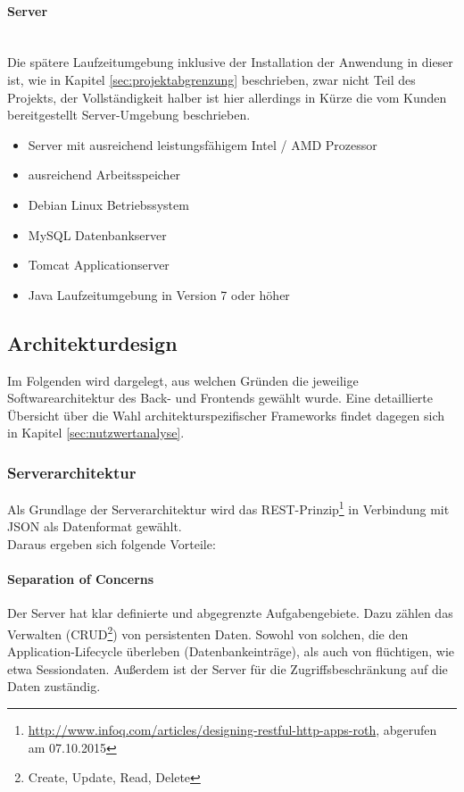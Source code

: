 \documentclass[12pt, xcolor=dvipsnames]{scrartcl}
\begin{document}
\paragraph{Server} ~\\
\label{par:zielplattform_server}%
Die spätere Laufzeitumgebung inklusive der Installation der Anwendung in dieser ist, wie in Kapitel \ref{sec:projektabgrenzung} beschrieben, zwar nicht Teil des Projekts, der Vollständigkeit halber ist hier allerdings in Kürze die vom Kunden bereitgestellt Server-Umgebung beschrieben.
\begin{itemize}
	\item Server mit ausreichend leistungsfähigem Intel / AMD Prozessor
	\item ausreichend Arbeitsspeicher
	\item Debian Linux Betriebssystem
	\item MySQL Datenbankserver
	\item Tomcat Applicationserver	
	\item Java Laufzeitumgebung in Version 7 oder höher
\end{itemize}


\subsection{Architekturdesign}

Im Folgenden wird dargelegt, aus welchen Gründen die jeweilige Softwarearchitektur des Back- und Frontends gewählt wurde. Eine detaillierte Übersicht über die Wahl architekturspezifischer Frameworks findet dagegen sich in Kapitel \ref{sec:nutzwertanalyse}. \\

\subsubsection{Serverarchitektur}

Als Grundlage der Serverarchitektur wird das
REST-Prinzip\footnote{\url{http://www.infoq.com/articles/designing-restful-http-apps-roth}, abgerufen am 07.10.2015} 
in Verbindung mit JSON als Datenformat gewählt. \\

Daraus ergeben sich folgende Vorteile:

\paragraph{Separation of Concerns}
Der Server hat klar definierte und abgegrenzte Aufgabengebiete. Dazu zählen das Verwalten
(CRUD\footnote{Create, Update, Read, Delete}) von persistenten Daten. Sowohl von solchen, die den Application-Lifecycle überleben (Datenbankeinträge), als auch von flüchtigen, wie etwa Sessiondaten. Außerdem ist der Server für die Zugriffsbeschränkung auf die Daten zuständig.
\end{document}
